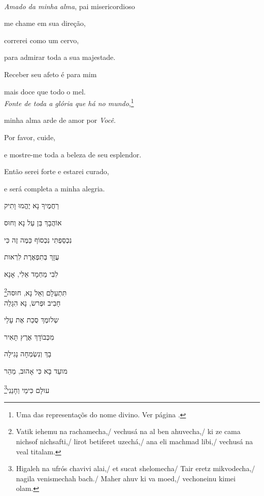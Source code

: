 \movetooddpage
\raggedright

\vspace*{1cm}

\textbf{}\\[15pt]

\emph{Amado da minha alma}, pai misericordioso

me chame em sua direção,

correrei como um cervo,

para admirar toda a sua majestade.

Receber seu afeto é para mim

mais doce que todo o mel.\\[10pt]

\emph{Fonte de toda a glória que há no mundo},\footnote{Uma das representaçõs do nome divino. Ver página \pageref{ref01}.}

minha alma arde de amor por \emph{Você}.

Por favor, cuide,

e mostre-me toda a beleza de seu esplendor.

Então serei forte e estarei curado,

e será completa a minha alegria.\\[10pt]

\movetoevenpage
\raggedleft

\vspace*{1cm}

רַחֲמֶיךָ נָא יֶהֱמוּ וָתִיק \label{ref02}

אוֹהֲבָךְ בֵּן עַל נָא וְחוּס 

נִכְסַפְתִּי נִכְסוֹף כַּמֶּה זֶה כִּי 

עֻזָךְ בְּתִפְאֶרֶת לִרְאות 

לִבִי מַחְמָד אֵלִי, אָנָא 

תִּתְעַלָם וְאַל נָא, חוּסה\footnote{Vatik iehemu na rachamecha,/
vechusá na al ben ahuvecha,/ ki ze cama nichsof nichsafti,/ lirot betiferet uzechá,/
ana eli machmad libi,/ vechusá na veal titalam.}\\[10pt]

חָבִיב וּפְרשׂ, נָא הִגָלֵה

שְלומֶךְ סֻכַת אֶת עָלַי 

מִכְּבוֹדָךְ אֶרֶץ תָּאִיר 

בָךְ וְנִשְׂמְחָה נָגִילָה 

מועֵד בָא כִּי אָהוּב, מַהֵר

עולָם כִּימֵי וְחָנֵנִי\footnote{
Higaleh na ufrós chavivi alai,/
et sucat shelomecha/ Tair eretz mikvodecha,/ nagila venismechah bach./ Maher ahuv ki va moed,/
vechoneinu kimei olam.}

